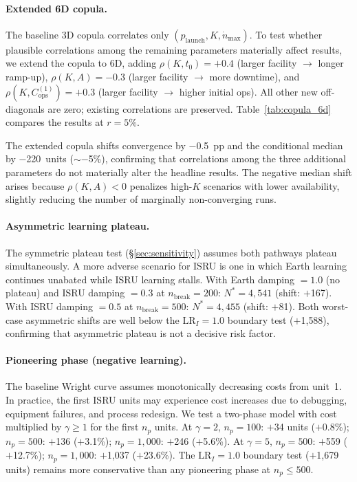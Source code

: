 \paragraph{Extended 6D copula.} The baseline 3D copula correlates only $(p_{\mathrm{launch}}, K, \dot{n}_{\max})$. To test whether plausible correlations among the remaining parameters materially affect results, we extend the copula to 6D, adding $\rho(K, t_0) = +0.4$ (larger facility $\to$ longer ramp-up), $\rho(K, A) = -0.3$ (larger facility $\to$ more downtime), and $\rho(K, C_{\mathrm{ops}}^{(1)}) = +0.3$ (larger facility $\to$ higher initial ops). All other new off-diagonals are zero; existing correlations are preserved. Table~\ref{tab:copula_6d} compares the results at $r = 5\%$.



The extended copula shifts convergence by $-$0.5~pp and the conditional median by $-$220~units (${\sim}-$5\%), confirming that correlations among the three additional parameters do not materially alter the headline results. The negative median shift arises because $\rho(K, A) < 0$ penalizes high-$K$ scenarios with lower availability, slightly reducing the number of marginally non-converging runs.

\paragraph{Asymmetric learning plateau.} The symmetric plateau test (\S\ref{sec:sensitivity}) assumes both pathways plateau simultaneously. A more adverse scenario for ISRU is one in which Earth learning continues unabated while ISRU learning stalls. With Earth damping $= 1.0$ (no plateau) and ISRU damping $= 0.3$ at $n_{\mathrm{break}} = 200$: $N^* = 4{,}541$ (shift: $+$167). With ISRU damping $= 0.5$ at $n_{\mathrm{break}} = 500$: $N^* = 4{,}455$ (shift: $+$81). Both worst-case asymmetric shifts are well below the $\mathrm{LR}_I = 1.0$ boundary test ($+$1{,}588), confirming that asymmetric plateau is not a decisive risk factor.

\paragraph{Pioneering phase (negative learning).} The baseline Wright curve assumes monotonically decreasing costs from unit~1. In practice, the first ISRU units may experience cost increases due to debugging, equipment failures, and process redesign. We test a two-phase model with cost multiplied by $\gamma \geq 1$ for the first $n_p$ units. At $\gamma = 2$, $n_p = 100$: $+$34 units ($+$0.8\%); $n_p = 500$: $+$136 ($+$3.1\%); $n_p = 1{,}000$: $+$246 ($+$5.6\%). At $\gamma = 5$, $n_p = 500$: $+$559 ($+$12.7\%); $n_p = 1{,}000$: $+$1{,}037 ($+$23.6\%). The $\mathrm{LR}_I = 1.0$ boundary test ($+$1{,}679 units) remains more conservative than any pioneering phase at $n_p \leq 500$.

